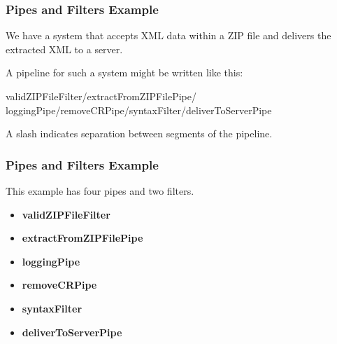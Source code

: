 \begin{frame}
\frametitle{Pipes and Filters Example}

\begin{changemargin}{1cm}
We have a system that accepts XML data within a ZIP file and delivers the extracted XML to a server.

A pipeline for such a system might be written like this:

validZIPFileFilter/extractFromZIPFilePipe/\\
loggingPipe/removeCRPipe/syntaxFilter/deliverToServerPipe


A slash indicates separation between segments of the pipeline.


\end{changemargin}
\end{frame}

\begin{frame}
\frametitle{Pipes and Filters Example}

\begin{changemargin}{1cm}
This example has four pipes and two filters.

\begin{itemize}
	\item \textbf{validZIPFileFilter} 
	\item \textbf{extractFromZIPFilePipe} 
	\item \textbf{loggingPipe} 
	\item \textbf{removeCRPipe} 
	\item \textbf{syntaxFilter} 
	\item \textbf{deliverToServerPipe} 
\end{itemize}


\end{changemargin}
\end{frame}


